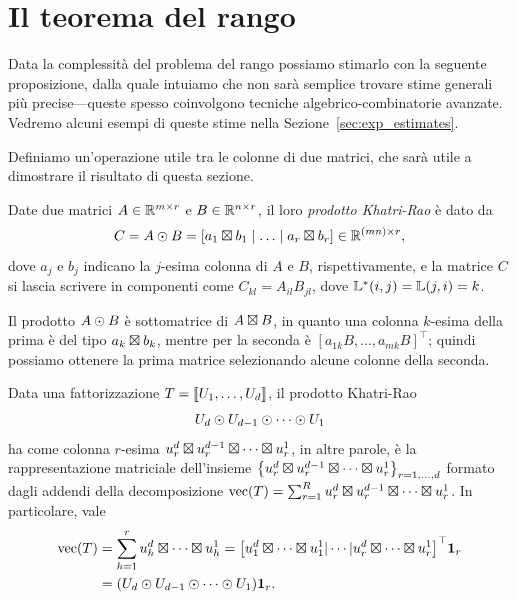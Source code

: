 \section{Il teorema del rango}

Data la complessità del problema del rango possiamo stimarlo con la seguente
proposizione, dalla quale intuiamo che non sarà semplice trovare stime generali più precise---queste spesso coinvolgono tecniche algebrico-combinatorie avanzate. Vedremo alcuni esempi di
queste stime nella Sezione~\ref{sec:exp_estimates}.

Definiamo un'operazione utile tra le colonne di due matrici, che sarà utile a dimostrare il
risultato di questa sezione.
\begin{definition}
	Date due matrici $ A \in \mathbb{R}^{m \times r} $ e $ B \in \mathbb{R}^{n \times r} $, il loro \emph{prodotto
		Khatri-Rao} è dato da
	\begin{equation}
		C = A \krp B = \left[ a_1 \krn b_1 \mid \ldots \mid a_r \krn b_r \right] \in \R^{(mn) \times r},
	\end{equation}
	dove $ a_j $ e $ b_j $ indicano la $ j$-esima colonna di $ A $ e $ B $, rispettivamente, e la matrice $ C $
	si lascia scrivere in componenti come $ C_{kl} = A_{il}B_{jl} $, dove $ \mathbb{L}^*(i,j) = \mathbb{L}(j,i) = k $.
\end{definition}
\begin{remark}
	\label{rmk:krp_sub_krn}
	Il prodotto $ A \mathbin{\odot} B $ è sottomatrice di $ A \mathbin{\boxtimes} B $, in quanto una colonna $ k $-esima della
	prima è del tipo $ a_{k} \mathbin{\boxtimes} b_{k} $, mentre per la seconda è $ \left[ a_{1k}B, \ldots, a_{mk}B
			\right]^{\top} $; quindi possiamo ottenere la prima matrice selezionando alcune colonne della
	seconda.
\end{remark}
\begin{remark}
	\label{rmk:krp_as_span}
	Data una fattorizzazione $ T = \dsqr{U_1, \ldots, U_{d}}$, il prodotto Khatri-Rao
	\begin{equation*}
		U_{d} \mathbin{\odot} U_{d-1} \mathbin{\odot} \cdots \mathbin{\odot} U_1
	\end{equation*}
	ha come colonna $ r $-esima $ u^d_r \mathbin{\boxtimes} u^{d-1}_r \mathbin{\boxtimes} \cdots  \mathbin{\boxtimes} u^1_r$, in altre parole, è la
	rappresentazione matriciale dell'insieme $ \left\{ u^d_r \krn u^{d-1}_r \krn \cdots  \krn u^1_r\right\}_{r=1,
				\ldots, d} $ formato
	dagli addendi della decomposizione $ \operatorname{vec}(T) = \sum_{r=1}^R u^d_r \mathbin{\boxtimes} u^{d-1}_r \mathbin{\boxtimes} \cdots  \mathbin{\boxtimes} u^1_r $.
	In particolare, vale
	\begin{equation*}
		\begin{aligned}
			\Vec({T}) & = \sum_{h=1}^r u_h^d \krn \cdots \krn u_h^1 = \left[ u_1^d
			\krn \cdots \krn u_1^1 | \cdots | u_r^d \krn \cdots \krn u_r^1\right]^{\top}\mathbf{1}_r \\
			          & = \left( U_d \krp U_{d-1} \krp \cdots \krp U_1 \right) \mathbf{1}_r.
		\end{aligned}
	\end{equation*}

\end{remark}

